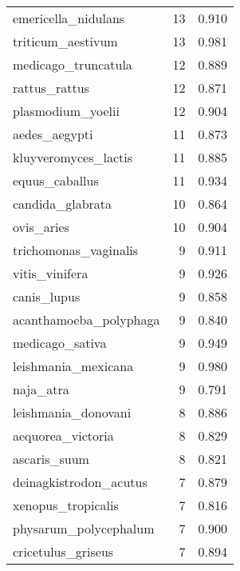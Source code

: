 \begin{tabular}{lrr}
            emericella\_nidulans &                  13 &     0.910 \\
              triticum\_aestivum &                  13 &     0.981 \\
            medicago\_truncatula &                  12 &     0.889 \\
                  rattus\_rattus &                  12 &     0.871 \\
              plasmodium\_yoelii &                  12 &     0.904 \\
                  aedes\_aegypti &                  11 &     0.873 \\
           kluyveromyces\_lactis &                  11 &     0.885 \\
                 equus\_caballus &                  11 &     0.934 \\
               candida\_glabrata &                  10 &     0.864 \\
                     ovis\_aries &                  10 &     0.904 \\
          trichomonas\_vaginalis &                   9 &     0.911 \\
                 vitis\_vinifera &                   9 &     0.926 \\
                    canis\_lupus &                   9 &     0.858 \\
         acanthamoeba\_polyphaga &                   9 &     0.840 \\
                medicago\_sativa &                   9 &     0.949 \\
            leishmania\_mexicana &                   9 &     0.980 \\
                      naja\_atra &                   9 &     0.791 \\
            leishmania\_donovani &                   8 &     0.886 \\
              aequorea\_victoria &                   8 &     0.829 \\
                   ascaris\_suum &                   8 &     0.821 \\
         deinagkistrodon\_acutus &                   7 &     0.879 \\
             xenopus\_tropicalis &                   7 &     0.816 \\
          physarum\_polycephalum &                   7 &     0.900 \\
             cricetulus\_griseus &                   7 &     0.894 \\

\end{tabular}
